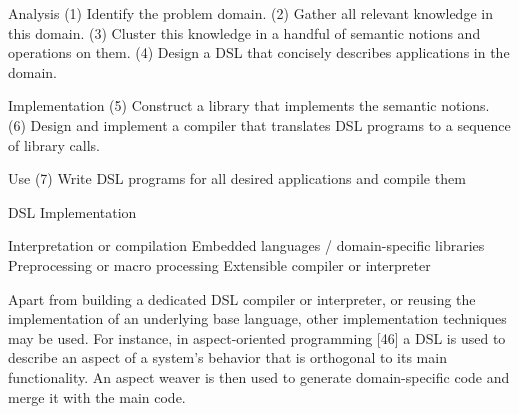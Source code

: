 Analysis (1) 
Identify the problem domain. (2) Gather all relevant
knowledge in this domain. (3) Cluster this knowledge
in a handful of semantic notions and operations on
them. (4) Design a DSL that concisely describes applications
in the domain.

Implementation (5) Construct a library that implements the
semantic notions. (6) Design and implement a compiler
that translates DSL programs to a sequence of library
calls.

Use (7) Write DSL programs for all desired applications and
compile them


DSL Implementation

Interpretation or compilation
Embedded languages / domain-specific libraries
Preprocessing or macro processing
Extensible compiler or interpreter

Apart from building a dedicated DSL compiler or interpreter,
or reusing the implementation of an underlying base
language, other implementation techniques may be used. For
instance, in aspect-oriented programming [46] a DSL is used
to describe an aspect of a system’s behavior that is orthogonal
to its main functionality. An aspect weaver is then used
to generate domain-specific code and merge it with the main
code.


